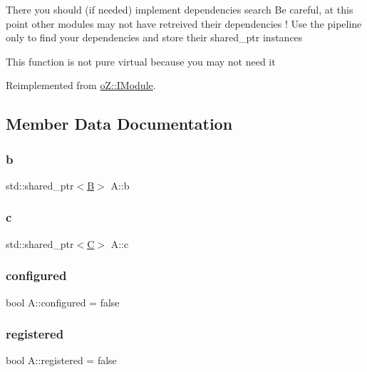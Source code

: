There you should (if needed) implement dependencies search Be careful, at this point other modules may not have retreived their dependencies ! Use the pipeline only to find your dependencies and store their shared\+\_\+ptr instances

This function is not pure virtual because you may not need it 

Reimplemented from \mbox{\hyperlink{classo_z_1_1_i_module_af183d3711ef7d7a6966ac078b63a7685}{o\+Z\+::\+I\+Module}}.



\subsection{Member Data Documentation}
\mbox{\label{class_a_a8bd74753f3d363c7f249ef6d6b55bc31}} 
\subsubsection{\texorpdfstring{b}{b}}
{\footnotesize\ttfamily std\+::shared\+\_\+ptr$<$\mbox{\hyperlink{class_b}{B}}$>$ A\+::b}

\mbox{\label{class_a_aade577263852e9bb04be26d377f990da}} 
\subsubsection{\texorpdfstring{c}{c}}
{\footnotesize\ttfamily std\+::shared\+\_\+ptr$<$\mbox{\hyperlink{class_c}{C}}$>$ A\+::c}

\mbox{\label{class_a_a56277b5454bbb3d64c068c3c86161a3f}} 
\subsubsection{\texorpdfstring{configured}{configured}}
{\footnotesize\ttfamily bool A\+::configured = false}

\mbox{\label{class_a_abbe7bfef380b5ba2aa123bcc96cb0785}} 
\subsubsection{\texorpdfstring{registered}{registered}}
{\footnotesize\ttfamily bool A\+::registered = false}

